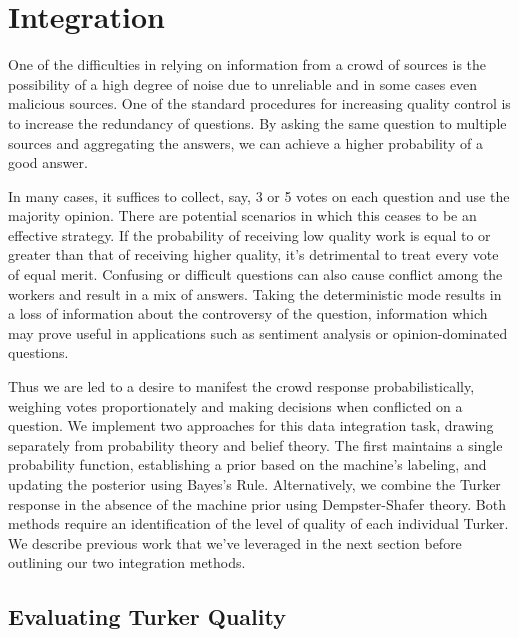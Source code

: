 \section{Integration}

One of the difficulties in relying on information from a crowd of sources is the possibility of a high degree of noise due to unreliable and in some cases even malicious sources.  One of the standard procedures for increasing quality control is to increase the redundancy of questions.  By asking the same question to multiple sources and aggregating the answers, we can achieve a higher probability of a good answer.

In many cases, it suffices to collect, say, 3 or 5 votes on each question and use the majority opinion.  There are potential scenarios in which this ceases to be an effective strategy.  If the probability of receiving low quality work is equal to or greater than that of receiving higher quality, it's detrimental to treat every vote of equal merit.  Confusing or difficult questions can also cause conflict among the workers and result in a mix of answers.  Taking the deterministic mode results in a loss of information about the controversy of the question, information which may prove useful in applications such as sentiment analysis or opinion-dominated questions.

Thus we are led to a desire to manifest the crowd response probabilistically, weighing votes proportionately and making decisions when conflicted on a question.  We implement two approaches for this data integration task, drawing separately from probability theory and belief theory.  The first maintains a single probability function, establishing a prior based on the machine's labeling, and updating the posterior using Bayes's Rule.  Alternatively, we combine the Turker response in the absence of the machine prior using Dempster-Shafer theory.  Both methods require an identification of the level of quality of each individual Turker.  We describe previous work that we've leveraged in the next section before outlining our two integration methods.

\subsection{Evaluating Turker Quality}

